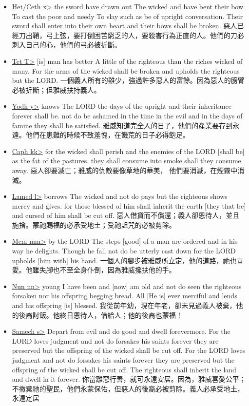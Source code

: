 \begin{itemize}
\item \underline{Het/Ceth  \<x>} the sword have drawn out The wicked and have bent their bow To cast the poor and needy To slay such as be of upright conversation. Their sword shall enter into their own heart and their bows shall be broken. 惡人已經刀出鞘，弓上弦，要打倒困苦窮乏的人，要殺害行為正直的人。他們的刀必刺入自己的心，他們的弓必被折斷。
\item \underline{Tet  \<T>} [is] man has better A little of the righteous than the riches wicked of many. For the arms of the wicked shall be broken and upholds the righteous but the LORD. 一個義人所有的雖少，強過許多惡人的富餘。因為惡人的膀臂必被折斷；但雅威扶持義人。
\item \underline{Yodh \<y>} knows The LORD the days of the upright and their inheritance forever shall be. not do be ashamed in the time in the evil and in the days of famine they shall be satisfied. 雅威知道完全人的日子，他們的產業要存到永遠。他們在患難的時候不致羞愧，在饑荒的日子必得飽足。
\item \underline{Caph \<kk>} for the wicked shall perish and the enemies of the LORD [shall be] as the fat of the pastures. they shall consume into smoke shall they consume away. 惡人卻要滅亡；雅威的仇敵要像草地的華美， 他們要消滅，在煙霧中消滅。
\item \underline{Lamed \<l>} borrows The wicked and not do pays but the righteous shows mercy and gives. for those blessed of him shall inherit the earth [they that be] and cursed of him shall be cut off. 惡人借貸而不償還；義人卻恩待人，並且施捨。蒙祂賜福的必承受地土；受祂詛咒的必被剪除。
\item \underline{Mem \<mm>} by the LORD The steps [good] of a man are ordered and in his way he delights. Though he fall not do be utterly cast down for the LORD upholds [him with] his hand. 一個人的腳步被雅威所立定，他的道路，祂也喜愛。他雖失腳也不至全身仆倒，因為雅威攙扶他的手。
\item \underline{Nun \<nn>} young I have been and [now] am old and not do seen the righteous forsaken nor his offspring begging bread. All [He is] ever merciful and lends and his offspring [is] blessed. 我從前年幼，現在年老，卻未見過義人被棄，他的後裔討飯。他終日恩待人，借給人；他的後裔也蒙福！
\item \underline{Samech \<s>} Depart from evil and do good and dwell forevermore. For the LORD loves judgment and not do forsakes his saints forever they are preserved but the offspring of the wicked shall be cut off. For the LORD loves judgment and not do forsakes his saints forever they are preserved but the offspring of the wicked shall be cut off. The righteous shall inherit the land and dwell in it forever. 你當離惡行善，就可永遠安居。因為，雅威喜愛公平；不撇棄祂的聖民，他們永蒙保佑，但惡人的後裔必被剪除。義人必承受地土，永遠定居

\end{itemize}
